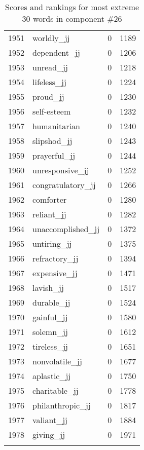\begin{longtable}[!htbp]{| rlr@{.}l |}
    1951 & worldly\_jj & 0 & 1189 \\
    1952 & dependent\_jj & 0 & 1206 \\
    1953 & unread\_jj & 0 & 1218 \\
    1954 & lifeless\_jj & 0 & 1224 \\
    1955 & proud\_jj & 0 & 1230 \\
    1956 & self-esteem & 0 & 1232 \\
    1957 & humanitarian & 0 & 1240 \\
    1958 & slipshod\_jj & 0 & 1243 \\
    1959 & prayerful\_jj & 0 & 1244 \\
    1960 & unresponsive\_jj & 0 & 1252 \\
    1961 & congratulatory\_jj & 0 & 1266 \\
    1962 & comforter & 0 & 1280 \\
    1963 & reliant\_jj & 0 & 1282 \\
    1964 & unaccomplished\_jj & 0 & 1372 \\
    1965 & untiring\_jj & 0 & 1375 \\
    1966 & refractory\_jj & 0 & 1394 \\
    1967 & expensive\_jj & 0 & 1471 \\
    1968 & lavish\_jj & 0 & 1517 \\
    1969 & durable\_jj & 0 & 1524 \\
    1970 & gainful\_jj & 0 & 1580 \\
    1971 & solemn\_jj & 0 & 1612 \\
    1972 & tireless\_jj & 0 & 1651 \\
    1973 & nonvolatile\_jj & 0 & 1677 \\
    1974 & aplastic\_jj & 0 & 1750 \\
    1975 & charitable\_jj & 0 & 1778 \\
    1976 & philanthropic\_jj & 0 & 1817 \\
    1977 & valiant\_jj & 0 & 1884 \\
    1978 & giving\_jj & 0 & 1971 \\
    \hline
    \caption{Scores and rankings for most extreme 30 words in component \#26} \\
\end{longtable}
